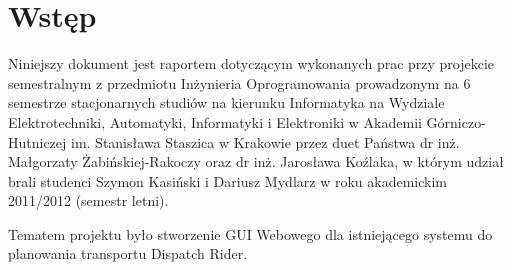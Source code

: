 \chapter{Wstęp}
Niniejszy dokument jest raportem dotyczącym wykonanych prac przy projekcie semestralnym
z przedmiotu Inżynieria Oprogramowania prowadzonym na 6 semestrze stacjonarnych
studiów na kierunku Informatyka na Wydziale Elektrotechniki, Automatyki, Informatyki i Elektroniki
w Akademii Górniczo-Hutniczej im. Stanisława Staszica w Krakowie przez duet Państwa
dr inż. Małgorzaty Żabińskiej-Rakoczy oraz dr inż. Jarosława Koźlaka, w którym udział brali studenci
Szymon Kasiński i Dariusz Mydlarz w roku akademickim 2011/2012 (semestr letni).

Tematem projektu było stworzenie GUI Webowego dla istniejącego systemu do planowania transportu Dispatch Rider.